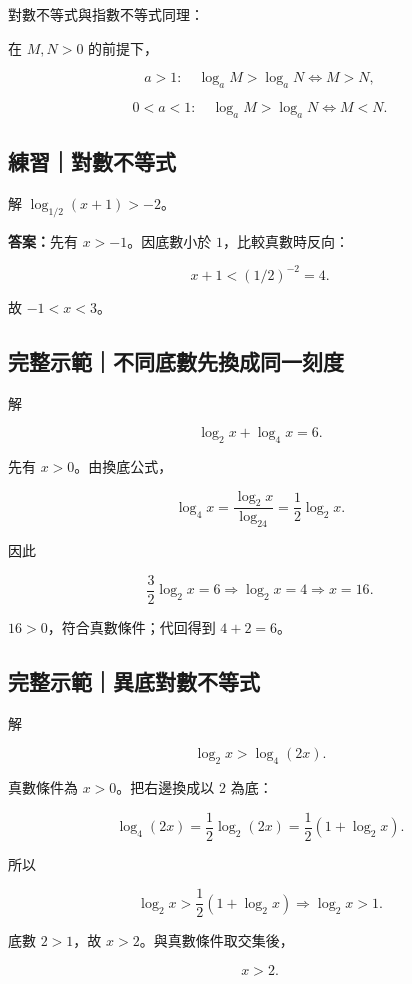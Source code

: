 \documentclass[11pt,a4paper]{article}
\begin{document}
對數不等式與指數不等式同理：

在 \(M,N>0\) 的前提下，

\[
a>1:\quad \log_aM>\log_aN\iff M>N,
\]

\[
0<a<1:\quad \log_aM>\log_aN\iff M<N.
\]

\begin{HandoutSelfCheck}

\subsection{練習｜對數不等式}\label{ux7df4ux7fd2ux5c0dux6578ux4e0dux7b49ux5f0f}

解 \(\log_{1/2}(x+1)>-2\)。

\textbf{答案：}先有 \(x>-1\)。因底數小於 \(1\)，比較真數時反向：

\[
x+1<(1/2)^{-2}=4.
\]

故 \(\boxed{-1<x<3}\)。

\end{HandoutSelfCheck}

\begin{HandoutWorkedExample}

\subsection{完整示範｜不同底數先換成同一刻度}\label{ux5b8cux6574ux793aux7bc4ux4e0dux540cux5e95ux6578ux5148ux63dbux6210ux540cux4e00ux523bux5ea6}

解

\[
\log_2x+\log_4x=6.
\]

先有 \(x>0\)。由換底公式，

\[
\log_4x=\frac{\log_2x}{\log_24}=\frac12\log_2x.
\]

因此

\[
\frac32\log_2x=6
\Longrightarrow
\log_2x=4
\Longrightarrow
\boxed{x=16}.
\]

\(16>0\)，符合真數條件；代回得到 \(4+2=6\)。

\end{HandoutWorkedExample}

\begin{HandoutWorkedExample}

\subsection{完整示範｜異底對數不等式}\label{ux5b8cux6574ux793aux7bc4ux7570ux5e95ux5c0dux6578ux4e0dux7b49ux5f0f}

解

\[
\log_2x>\log_4(2x).
\]

真數條件為 \(x>0\)。把右邊換成以 \(2\) 為底：

\[
\log_4(2x)
=\frac12\log_2(2x)
=\frac12(1+\log_2x).
\]

所以

\[
\log_2x>\frac12(1+\log_2x)
\Longrightarrow
\log_2x>1.
\]

底數 \(2>1\)，故 \(x>2\)。與真數條件取交集後，

\[
\boxed{x>2}.
\]

\end{HandoutWorkedExample}
\end{document}
